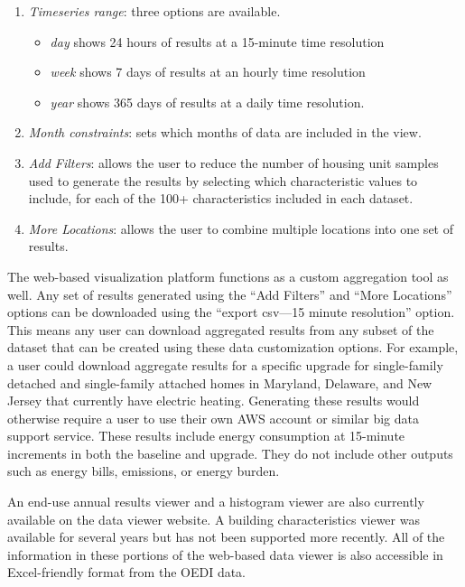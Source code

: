 \begin{enumerate}
\begin{itemize}
\end{itemize}
\item  \textit{Timeseries range}: three options are available.
\begin{itemize}
    \item \textit{day} shows 24 hours of results at a 15-minute time resolution
    \item \textit{week} shows 7 days of results at an hourly time resolution
    \item \textit{year} shows 365 days of results at a daily time resolution.
\end{itemize}
\item  \textit{Month constraints}: sets which months of data are included in the view.
\item \textit{Add Filters}: allows the user to reduce the number of housing unit samples used to generate the results by selecting which characteristic values to include, for each of the 100+ characteristics included in each dataset.
\item \textit{More Locations}: allows the user to combine multiple locations into one set of results. 
\end{enumerate}
The web-based visualization platform functions as a custom aggregation tool as well. Any set of results generated using the ``Add Filters'' and ``More Locations'' options can be downloaded using the ``export csv---15 minute resolution'' option. This means any user can download aggregated results from any subset of the dataset that can be created using these data customization options. For example, a user could download aggregate results for a specific upgrade for single-family detached and single-family attached homes in Maryland, Delaware, and New Jersey that currently have electric heating. Generating these results would otherwise require a user to use their own AWS account or similar big data support service. These results include energy consumption at 15-minute increments in both the baseline and upgrade. They do not include other outputs such as energy bills, emissions, or energy burden.

An end-use annual results viewer and a histogram viewer are also currently available on the data viewer website. A building characteristics viewer was available for several years but has not been supported more recently. All of the information in these portions of the web-based data viewer is also accessible in Excel-friendly format from the OEDI data.

